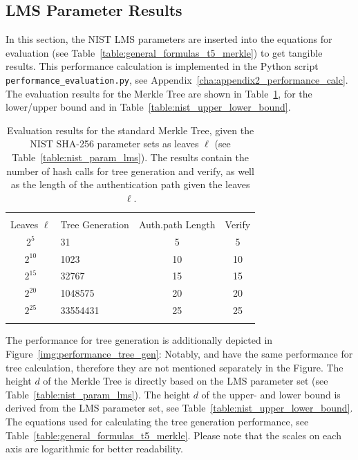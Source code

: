 \subsection{LMS Parameter Results}
In this section, the NIST LMS parameters are inserted into the equations for evaluation (see Table~\ref{table:general_formulas_t5_merkle}) to get tangible results. 
This performance calculation is implemented in the Python script \texttt{performance_evaluation.py}, see Appendix~\ref{cha:appendix2_performance_calc}.
The evaluation results for the Merkle Tree are shown in Table~\ref{table:eval_merkle_tree_NIST}, for the lower/upper bound \tftree and \extree in Table~\ref{table:nist_upper_lower_bound}.

\begin{table}
\centering
\begin{tabular}{c l c c} 
 \hline\noalign{\smallskip}
 \multicolumn{4}{c}{\textbf{Evaluation Results NIST: Merkle Tree}} \\
 \noalign{\smallskip} 
  Leaves $\ell$ & Tree Generation & Auth.path Length & Verify \\
 \hline\noalign{\smallskip}
 $2^5$ & 31 & 5 & 5 \\
 $2^{10}$ & 1023 & 10 & 10 \\
 $2^{15}$ & 32767 & 15 & 15 \\ 
 $2^{20}$ & 1048575 & 20 & 20 \\ 
 $2^{25}$ & 33554431 & 25 & 25 \\ 
 \hline\noalign{\smallskip}
 \end{tabular}
\caption{Evaluation results for the standard Merkle Tree, given the NIST SHA-256 parameter sets as leaves $\ell$ (see Table~\ref{table:nist_param_lms}). The results contain the number of hash calls for tree generation and verify, as well as the length of the authentication path given the leaves $\ell$.}
\label{table:eval_merkle_tree_NIST}
\end{table}
The performance for tree generation is additionally depicted in Figure~\ref{img:performance_tree_gen}: Notably, \tftree and \extree have the same performance for tree calculation, therefore they are not mentioned separately in the Figure. The height $d$ of the Merkle Tree is directly based on the LMS parameter set (see Table~\ref{table:nist_param_lms}). The height $d$ of the upper- and lower bound \tftree is derived from the LMS parameter set, see Table~\ref{table:nist_upper_lower_bound}. The equations used for calculating the tree generation performance, see Table~\ref{table:general_formulas_t5_merkle}. Please note that the scales on each axis are logarithmic for better readability.

